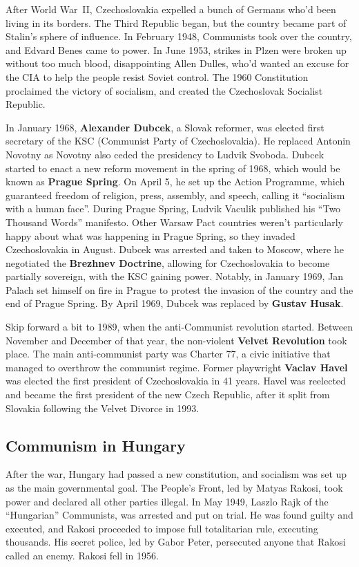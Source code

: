 After World War~II, Czechoslovakia expelled a bunch of Germans who'd been living in its borders.
The Third Republic began, but the country became part of Stalin's sphere of influence.
In February 1948, Communists took over the country, and Edvard Benes came to power.
In June 1953, strikes in Plzen were broken up without too much blood,
disappointing Allen Dulles,
who'd wanted an excuse for the CIA to help the people resist Soviet control.
The 1960 Constitution proclaimed the victory of socialism,
and created the Czechoslovak Socialist Republic.

In January 1968, \textbf{Alexander Dubcek}, a Slovak reformer,
was elected first secretary of the KSC (Communist Party of Czechoslovakia).
He replaced Antonin Novotny as Novotny also ceded the presidency to Ludvik Svoboda.
Dubcek started to enact a new reform movement in the spring of 1968,
which would be known as \textbf{Prague Spring}.
On April 5,
he set up the Action Programme, which guaranteed freedom of religion, press, assembly, and speech,
calling it ``socialism with a human face''.
During Prague Spring, Ludvik Vaculik published his ``Two Thousand Words'' manifesto.
Other Warsaw Pact countries weren't particularly happy about what was happening in Prague Spring,
so they invaded Czechoslovakia in August.
Dubcek was arrested and taken to Moscow, where he negotiated the \textbf{Brezhnev Doctrine},
allowing for Czechoslovakia to become partially sovereign, with the KSC gaining power.
Notably, in January 1969,
Jan Palach set himself on fire in Prague to protest the invasion of the country
and the end of Prague Spring.
By April 1969, Dubcek was replaced by \textbf{Gustav Husak}.

Skip forward a bit to 1989, when the anti-Communist revolution started.
Between November and December of that year,
the non-violent \textbf{Velvet Revolution} took place.
The main anti-communist party was Charter 77,
a civic initiative that managed to overthrow the communist regime.
Former playwright \textbf{Vaclav Havel}
was elected the first president of Czechoslovakia in 41 years.
Havel was reelected and became the first president of the new Czech Republic,
after it split from Slovakia following the Velvet Divorce in 1993.

\subsection*{Communism in Hungary}

After the war, Hungary had passed a new constitution,
and socialism was set up as the main governmental goal.
The People's Front, led by Matyas Rakosi, took power and declared all other parties illegal.
In May 1949, Laszlo Rajk of the ``Hungarian'' Communists, was arrested and put on trial.
He was found guilty and executed,
and Rakosi proceeded to impose full totalitarian rule, executing thousands.
His secret police, led by Gabor Peter, persecuted anyone that Rakosi called an enemy.
Rakosi fell in 1956.

